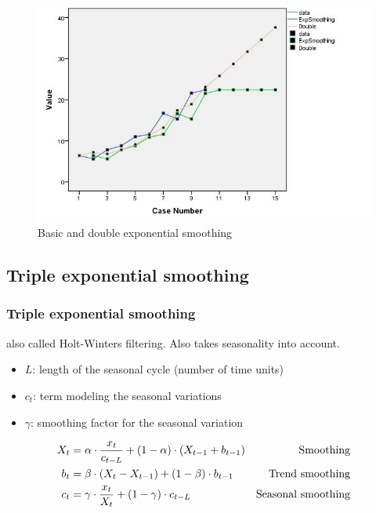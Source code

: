 \documentclass{beamer}
\begin{document}
\begin{frame}
  \begin{figure}
    \centering
    \includegraphics[width=\textwidth]{img/tijdreeks71}
    \caption{Basic and double exponential smoothing}
    \label{fig:tijdreeks71}
  \end{figure}
\end{frame}

\subsection{Triple exponential smoothing}

\begin{frame}
  \frametitle{Triple exponential smoothing}
  also called Holt-Winters filtering. Also takes seasonality into account.

  \begin{itemize}
    \item $L$: length of the seasonal cycle (number of time units)
    \item $c_t$: term modeling the seasonal variations
    \item $\gamma$: smoothing factor for the seasonal variation
  \end{itemize}

\begin{align*}
  X_{t} &= \alpha \cdot \frac{x_{t}}{c_{t-L}} + (1-\alpha) \cdot (X_{t-1} + b_{t-1}) & \textnormal{Smoothing}\\
  b_{t} &= \beta \cdot (X_{t} - X_{t-1}) + (1-\beta) \cdot b_{t-1} & \textnormal{Trend smoothing} \\
  c_{t} &= \gamma \cdot \frac{x_{t}}{X_{t}} + (1-\gamma) \cdot c_{t-L} & \textnormal{Seasonal smoothing} \\
\label{eq:HoltWinters}
\end{align*}

\end{frame}
\end{document}
